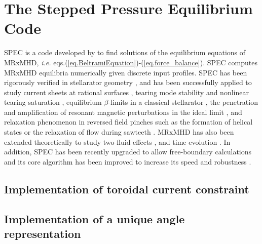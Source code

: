 \chapter{The Stepped Pressure Equilibrium Code}

\ac{SPEC} is a code developed by \citet{Hudson2012} to find solutions of the equilibrium equations of \ac{MRxMHD}, \textit{i.e.} eqs.(\ref{eq.BeltramiEquation})-(\ref{eq.force_balance}). \ac{SPEC} \citep{Hudson2012,Hudson2012} computes \ac{MRxMHD} equilibria numerically given discrete input profiles. \ac{SPEC} has been rigorously verified in stellarator geometry \citep{Loizu2016}, and has been successfully applied to study current sheets at rational surfaces \citep{Loizu2015,Loizu2015a}, tearing mode stability \citep{Loizu2019} and nonlinear tearing saturation \citep{Loizu2020}, equilibrium $\beta$-limits in a classical stellarator \citep{Loizu2017}, the penetration and amplification of resonant magnetic perturbations in the ideal limit \citep{Loizu2016}, and relaxation phenomenon in reversed field pinches such as the formation of helical states \citep{Dennis2013a} or the relaxation of flow during sawteeth \citep{Dennis2014,Qu2020}. \ac{MRxMHD} has also been extended theoretically to study two-fluid effects \citep{Lingam2016}, and time evolution \citep{Dewar2015,Dewar2017a,Dewar2020}. In addition, \ac{SPEC} has been recently upgraded to allow free-boundary calculations \citep{Hudson2020c} and its core algorithm has been improved to increase its speed and robustness \citep{Qu2020}.



\section{Implementation of toroidal current constraint}




\section{Implementation of a unique angle representation}